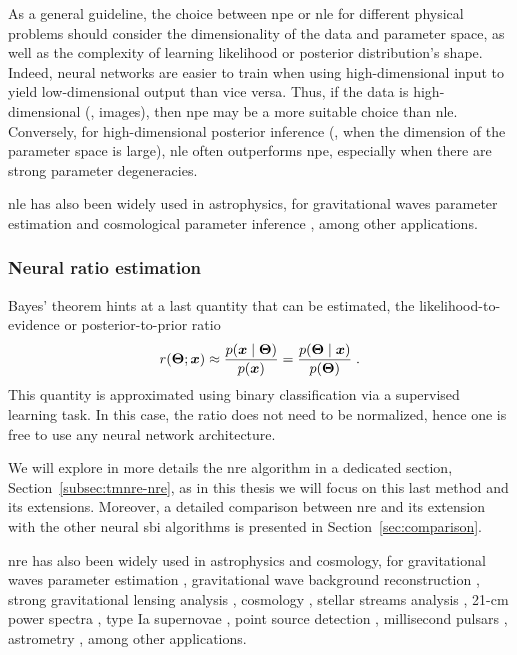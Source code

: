 As a general guideline, the choice between \gls*{npe} or \gls*{nle} for different physical problems should consider the dimensionality of the data and parameter space, as well as the complexity of learning likelihood or posterior distribution's shape. Indeed, neural networks are easier to train when using high-dimensional input to yield low-dimensional output than vice versa. Thus, if the data is high-dimensional (\eg, images), then \gls*{npe} may be a more suitable choice than \gls*{nle}. Conversely, for high-dimensional posterior inference (\ie, when the dimension of the parameter space is large), \gls*{nle} often outperforms \gls*{npe}, especially when there are strong parameter degeneracies. 

\Gls*{nle} has also been widely used in astrophysics, for gravitational waves parameter estimation \cite{Vilchez:2024qnw} and cosmological parameter inference \cite{Alsing:2019xrx, Modi:2023drt, Makinen:2021nly, DES:2024xij, Jeffrey:2020aa, vonWietersheim-Kramsta:2024cks}, among other applications.


\subsubsection{Neural ratio estimation}

Bayes' theorem hints at a last quantity that can be estimated, the likelihood-to-evidence or posterior-to-prior ratio 
\begin{equation}
	r(\bm{\Theta};\bm{x})\approx\frac{p(\bm{x}\mid\bm{\Theta})}{p(\bm{x})}=\frac{p(\bm{\Theta}\mid\bm{x})}{p(\bm{\Theta})}\; .
\end{equation}
This quantity is approximated using binary classification via a supervised learning task. In this case, the ratio does not need to be normalized, hence one is free to use any neural network architecture. 

We will explore in more details the \gls*{nre} algorithm in a dedicated section, Section~\ref{subsec:tmnre-nre}, as in this thesis we will focus on this last method and its extensions. Moreover, a detailed comparison between \gls*{nre} and its extension with the other neural \gls*{sbi} algorithms is presented in Section~\ref{sec:comparison}.

\Gls*{nre} has also been widely used in astrophysics and cosmology, for gravitational waves parameter estimation \cite{Bhardwaj:2023xph, Alvey:2023naa}, gravitational wave background reconstruction \cite{Alvey:2023npw}, strong gravitational lensing analysis \cite{Montel:2022fhv,  Coogan:2022cky, Brehmer:2019jyt, Zhang:2022djp}, cosmology \cite{List:2023aa, Cole:2021gwr, FrancoAbellan:2024tbj}, stellar streams analysis \cite{Hermans:2020skz, Alvey:2023pkx}, 21-cm power spectra \cite{Saxena:2023tue}, type Ia supernovae \cite{Karchev:2022xyn, Karchev:2024stw}, point source detection \cite{AnauMontel:2022ppb}, millisecond pulsars \cite{Berteaud:2024zda}, astrometry \cite{Mishra-Sharma:2021nhh}, among other applications. 


